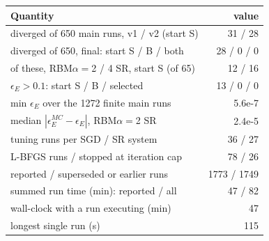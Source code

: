 \begin{tabular}{lr}\toprule
Quantity & value \\\midrule
diverged of 650 main runs, v1 / v2 (start S) & 31 / 28 \\
diverged of 650, final: start S / B / both & 28 / 0 / 0 \\
of these, RBM$\alpha{=}$2 / 4 SR, start S (of 65) & 12 / 16 \\
$\epsilon_E>0.1$: start S / B / selected & 13 / 0 / 0 \\
min $\epsilon_E$ over the 1272 finite main runs & 5.6e-7 \\
median $|\epsilon_E^{MC}-\epsilon_E|$, RBM$\alpha{=}$2 SR & 2.4e-5 \\
tuning runs per SGD / SR system & 36 / 27 \\
L-BFGS runs / stopped at iteration cap & 78 / 26 \\
reported / superseded or earlier runs & 1773 / 1749 \\
summed run time (min): reported / all & 47 / 82 \\
wall-clock with a run executing (min) & 47 \\
longest single run (s) & 115 \\
\bottomrule\end{tabular}
